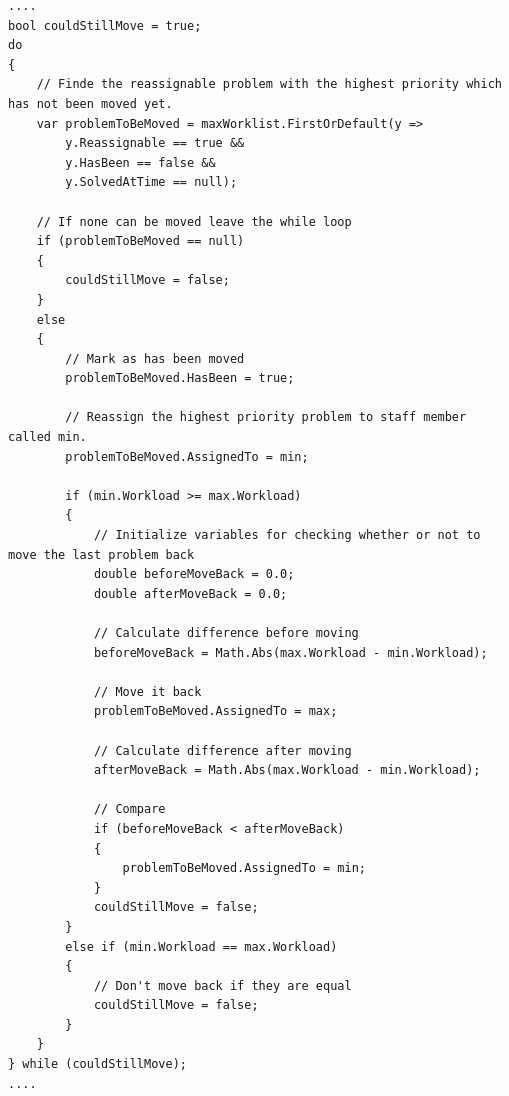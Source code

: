 \begin{lstlisting}[style=sourceCode, caption=\myCaption{A code snippet of the balance workload method. The presented code is within a for loop running for each staff member minus one. ``min'' and ``max'' are the person objects of which the algorithm are currently moving problems between. \vari{maxWorklist} is a sorted worklist, which is sorted before the code snippet is called. It is sorted in non-deacreasing order according to the estimated time consumption. }, label=lst:balanceWorkload]
....
bool couldStillMove = true;
do
{
    // Finde the reassignable problem with the highest priority which has not been moved yet. 
    var problemToBeMoved = maxWorklist.FirstOrDefault(y =>
	    y.Reassignable == true &&
	    y.HasBeen == false &&
	    y.SolvedAtTime == null);
                  
    // If none can be moved leave the while loop
    if (problemToBeMoved == null)
    {
        couldStillMove = false;
    }
    else
    {
        // Mark as has been moved
        problemToBeMoved.HasBeen = true;

        // Reassign the highest priority problem to staff member called min.
        problemToBeMoved.AssignedTo = min;

        if (min.Workload >= max.Workload)
        {
            // Initialize variables for checking whether or not to move the last problem back
            double beforeMoveBack = 0.0;
            double afterMoveBack = 0.0;

            // Calculate difference before moving
            beforeMoveBack = Math.Abs(max.Workload - min.Workload);

            // Move it back
            problemToBeMoved.AssignedTo = max;

            // Calculate difference after moving
            afterMoveBack = Math.Abs(max.Workload - min.Workload);

            // Compare
            if (beforeMoveBack < afterMoveBack)
            {
                problemToBeMoved.AssignedTo = min;
            }
            couldStillMove = false;
        }
        else if (min.Workload == max.Workload)
        {
            // Don't move back if they are equal
            couldStillMove = false;
        }
    }
} while (couldStillMove);
....
\end{lstlisting}


